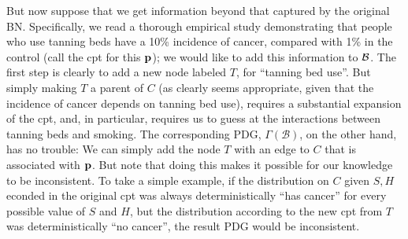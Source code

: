 \documentclass{article}
\numberwithin{equation}{section}
\begin{document}
\begin{example}[emulating a BN]
        But now suppose that we get information beyond that captured by the
original BN.  Specifically, we read a thorough empirical study 
        demonstrating that people who use tanning beds have a
                10\% incidence of cancer, compared with 1\% in the
                control (call the cpt for this $\mathbf p$); we would
                like to add this information to $\cal B$.  
		The first step is clearly to add a new node labeled
                $T$, for ``tanning bed use''.  But simply making $T$ a
                parent of $C$ (as clearly seems appropriate, given
                that 
                the incidence of cancer depends on tanning bed use),
                requires a substantial expansion of the cpt, and, in
                particular, requires us to guess at the interactions
                between tanning beds and smoking.  
%		
		The corresponding PDG, $\Gamma(\mathcal B)$, on the other hand, has no trouble:
		We can simply add the node $T$ with an edge to $C$ that is associated with $\mathbf p$. 
%		
                But note that doing this makes it possible for our
                knowledge to be 
                inconsistent. To take a simple example, if the
                distribution on $C$ 
                given $S,H$ econded in the original cpt was  always
                deterministically ``has cancer'' for every possible
                value of $S$ and $H$, but the distribution according
                to the new cpt from $T$ was deterministically ``no
                cancer'', the result PDG would be inconsistent.  
		


\end{example}
\end{document}
